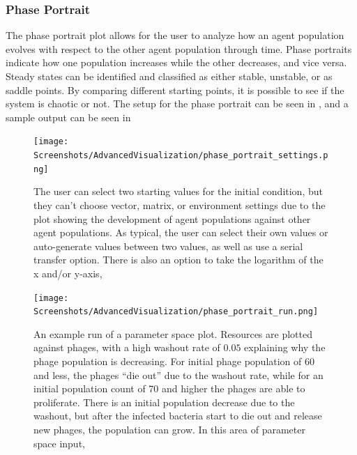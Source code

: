 \subsubsection{Phase Portrait}
The phase portrait plot allows for the user to analyze how an agent population evolves with respect to the other agent population through time. 
Phase portraits indicate how one population increases while the other decreases, and vice versa. 
Steady states can be identified and classified as either stable, unstable, or as saddle points. 
By comparing different starting points, it is possible to see if the system is chaotic or not. 
The setup for the phase portrait can be seen in , and a sample output can be seen in 
\begin{figure}
    \centering 
    \texttt{[image: Screenshots/AdvancedVisualization/phase\_portrait\_settings.png]}
    \caption{
        The user can select two starting values for the initial condition, but they can't choose vector, matrix, or environment settings due to the plot showing the development of agent populations against other agent populations. 
        As typical, the user can select their own values or auto-generate values between two values, as well as use a serial transfer option. 
        There is also an option to take the logarithm of the x and/or y-axis, 
    }
    \label{fig:ss:av:phase_portrait_settings}
\end{figure}
\begin{figure}
    \centering 
    \texttt{[image: Screenshots/AdvancedVisualization/phase\_portrait\_run.png]}
    \caption{
        An example run of a parameter space plot. 
        Resources are plotted against phages, with a high washout rate of $0.05$ explaining why the phage population is decreasing. 
        For initial phage population of 60 and less, the phages “die out” due to the washout rate, while for an initial population count of 70 and higher the phages are able to proliferate. 
        There is an initial population decrease due to the washout, but after the infected bacteria start to die out and release new phages, the population can grow. 
        In this area of parameter space input, 
    }
    \label{fig:ss:av:phase_portrait_run}
\end{figure}

